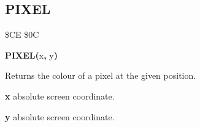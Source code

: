 
\newpage
\subsection{PIXEL}
\begin{description}[leftmargin=2cm,style=nextline]
\item [Token:] \$CE \$0C
\item [Format:] {\bf PIXEL(}x{\bf,} y{\bf)}
\item [Usage:]  Returns the colour of a pixel at the given position.

               {\bf x} absolute screen coordinate.

               {\bf y} absolute screen coordinate.
\end{description}



\newpage
